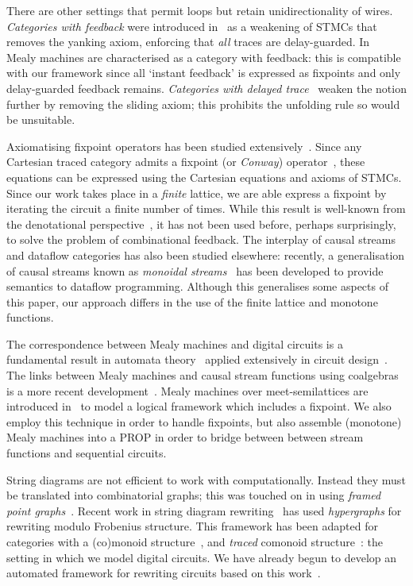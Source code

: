 \documentclass{lmcs}
\begin{document}
There are other settings that permit loops but retain unidirectionality of
wires.
\emph{Categories with feedback} were introduced in~\cite{katis2002feedback} as a
weakening of STMCs that removes the yanking axiom, enforcing that \emph{all}
traces are delay-guarded.
In~\cite{dilavore2021canonical} Mealy machines are characterised as a category
with feedback: this is compatible with our framework since all `instant
feedback' is expressed as fixpoints and only delay-guarded feedback remains.
\emph{Categories with delayed trace}~\cite{sprunger2019differentiable} weaken
the notion further by removing the sliding axiom; this prohibits the unfolding
rule so would be unsuitable.

Axiomatising fixpoint operators has been studied
extensively~\cite{bloom1993iteration,stefanescu2000network,simpson2000complete}.
Since any Cartesian traced category admits a fixpoint (or \emph{Conway})
operator~\cite{hasegawa1997recursion}, these equations can be expressed using
the Cartesian equations and axioms of STMCs.
Since our work takes place in a \emph{finite} lattice, we are able express a
fixpoint by iterating the circuit a finite number of times.
While this result is well-known from the denotational
perspective~\cite{stoltenberg-hansen1994mathematical}, it has not been used
before, perhaps surprisingly, to solve the problem of combinational feedback.
The interplay of causal streams and dataflow categories has also been studied
elsewhere: recently, a generalisation of causal streams known as
\emph{monoidal streams}~\cite{dilavore2022monoidala} has been developed to
provide semantics to dataflow programming.
Although this generalises some aspects of this paper, our approach differs in
the use of the finite lattice and monotone functions.

The correspondence between Mealy machines and digital circuits is a fundamental
result in automata theory~\cite{mealy1955method} applied extensively in circuit
design~\cite{kohavi2009switching}.
The links between Mealy machines and causal stream functions using coalgebras is
a more recent
development~\cite{rutten2005coinductive,rutten2005algebra,rutten2006algebraic}.
Mealy machines over meet-semilattices are introduced
in~\cite{bonsangue2008coalgebraic} to model a logical framework which includes
a fixpoint.
We also employ this technique in order to handle fixpoints, but also assemble
(monotone) Mealy machines into a PROP in order to bridge between
between stream functions and sequential circuits.

String diagrams are not efficient to work with computationally.
Instead they must be translated into combinatorial graphs; this was touched on
in \cite{ghica2017diagrammatic} using
\emph{framed point graphs}~\cite{kissinger2012pictures}.
Recent work in string diagram
rewriting~\cite{bonchi2022string,bonchi2022stringa,bonchi2022stringb} has used
\emph{hypergraphs} for rewriting modulo Frobenius structure.
This framework has been adapted for categories with a (co)monoid
structure~\cite{fritz2023free,milosavljevic2023string}, and \emph{traced}
comonoid structure~\cite{ghica2026rewriting}: the setting in which we model
digital circuits.
We have already begun to develop an automated framework for rewriting
circuits based on this work~\cite{kaye2026circuitcj}.
\end{document}
